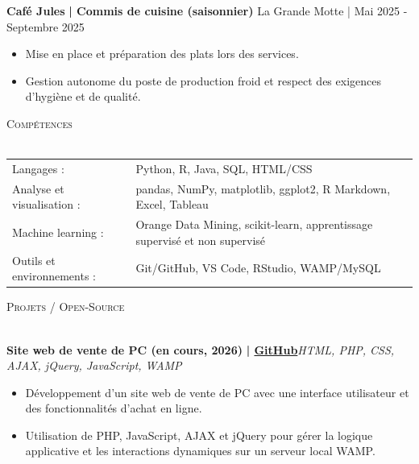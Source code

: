 \documentclass[a4paper]{article}
\newcommand{\lineunder} {
    \vspace*{-8pt} \\
    \hspace*{-18pt} \hrulefill \\
}
\newcommand{\header} [1] {
    {\hspace*{-18pt}\vspace*{6pt} \textsc{#1}}
    \vspace*{-6pt} \lineunder
}
\begin{document}
	\textbf{Café Jules}\textbf{ | Commis de cuisine (saisonnier)} \hfill La Grande Motte | Mai 2025 - Septembre 2025\\
              \vspace{-3mm}
\begin{itemize} \itemsep -3pt
\item  Mise en place et préparation des plats lors des services.
\item  Gestion autonome du poste de production froid et respect des exigences d'hygiène et de qualité.
\end{itemize}

%
%
  \header{Compétences}
  \vspace{2mm}

  \begin{longtable}{p{4cm}p{12cm}}
    Langages : & Python, R, Java, SQL, HTML/CSS \\
    Analyse et visualisation : & pandas, NumPy, matplotlib, ggplot2, R Markdown, Excel, Tableau \\
    Machine learning : & Orange Data Mining, scikit-learn, apprentissage supervisé et non supervisé \\
    Outils et environnements : & Git/GitHub, VS Code, RStudio, WAMP/MySQL \\
  \end{longtable}
  \vspace{1mm}

      \header{Projets / Open-Source}
      \vspace{2mm}

        {\textbf{Site web de vente de PC (en cours, 2026)}}\textbf{ | \href{https://github.com/Ashborn539/TyldenHounsa}{GitHub}}\hfill{\sl HTML, PHP, CSS, AJAX, jQuery, JavaScript, WAMP}\\
                    \vspace{-3mm}
\begin{itemize} \itemsep -3pt
\item  Développement d'un site web de vente de PC avec une interface utilisateur et des fonctionnalités d'achat en ligne.
\item  Utilisation de PHP, JavaScript, AJAX et jQuery pour gérer la logique applicative et les interactions dynamiques sur un serveur local WAMP.
\end{itemize}
                    \vspace*{3mm}
\end{document}
